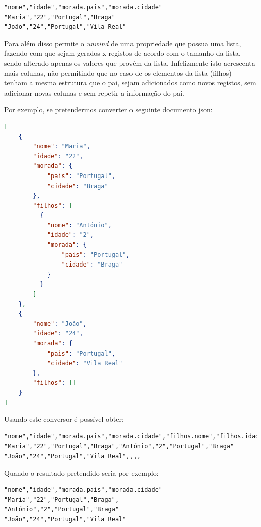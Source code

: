\begin{lstlisting}[caption=Resultado da conversão do exemplo~\ref{exem:jsonBib} usando o conversor \texttt{json2csv}, label=exem:json2csv]
"nome","idade","morada.pais","morada.cidade"
"Maria","22","Portugal","Braga"
"João","24","Portugal","Vila Real"
\end{lstlisting}

Para além disso permite o \textit{unwind} de uma propriedade que possua uma lista, fazendo com que sejam gerados x registos de acordo com o tamanho da lista, sendo alterado apenas os valores que provêm da lista. Infelizmente isto acrescenta mais colunas, não permitindo que no caso de os elementos da lista (filhos) tenham a mesma estrutura que o pai, sejam adicionados como novos registos, sem adicionar novas colunas e sem repetir a informação do pai. 

Por exemplo, se pretendermos converter o seguinte documento \acrshort{json}:
\begin{lstlisting}[language=json, caption=Outro exemplo em \acrshort{json} a converter, label=exem:jsonBib2]
[
    {
        "nome": "Maria",
        "idade": "22",
        "morada": {
            "pais": "Portugal",
            "cidade": "Braga"
        },
        "filhos": [
          {
            "nome": "António",
            "idade": "2",
            "morada": {
                "pais": "Portugal",
                "cidade": "Braga"
            }
          }
        ]
    },
    {
        "nome": "João",
        "idade": "24",
        "morada": {
            "pais": "Portugal",
            "cidade": "Vila Real"
        },
        "filhos": []
    }
]
\end{lstlisting}

Usando este conversor é possível obter:
\begin{lstlisting}[caption=Resultado da conversão do exemplo~\ref{exem:jsonBib2} usando o conversor \texttt{json2csv}]
"nome","idade","morada.pais","morada.cidade","filhos.nome","filhos.idade","filhos.morada.pais","filhos.morada.cidade"
"Maria","22","Portugal","Braga","António","2","Portugal","Braga"
"João","24","Portugal","Vila Real",,,,
\end{lstlisting}

Quando o resultado pretendido seria por exemplo:
\begin{lstlisting}[caption=Resultado pretendido da conversão do exemplo~\ref{exem:jsonBib2}]
"nome","idade","morada.pais","morada.cidade"
"Maria","22","Portugal","Braga",
"António","2","Portugal","Braga"
"João","24","Portugal","Vila Real"
\end{lstlisting}


